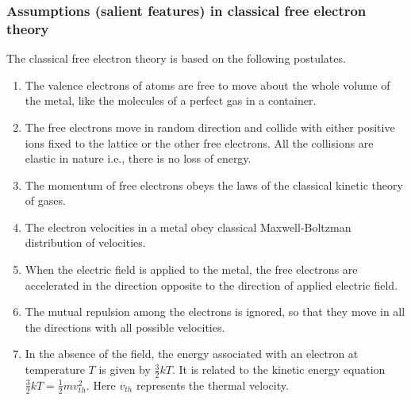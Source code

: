 \subsubsection{Assumptions (salient features) in classical free electron theory}
	The classical free electron theory is based on the following postulates.
\begin{enumerate}
	\item  The valence electrons of atoms are free to move about the whole volume of the metal, like the molecules of a perfect gas in a container.
	\item The free electrons move in random direction and collide with either positive ions fixed to the lattice or the other free electrons. All the collisions are elastic in nature i.e., there is no loss of energy.
	\item The momentum of free electrons obeys the laws of the classical kinetic theory of gases.
	\item The electron velocities in a metal obey classical Maxwell-Boltzman distribution of velocities.
	\item When the electric field is applied to the metal, the free electrons are accelerated in the direction opposite to the direction of applied electric field.
	\item  The mutual repulsion among the electrons is ignored, so that they move in all the directions with all possible velocities.
	\item  In the absence of the field, the energy associated with an electron at temperature $T$ is given by $\frac{3}{2} k T$. It is related to the kinetic energy equation $\frac{3}{2} k T=\frac{1}{2} m v_{t h}^{2}$. Here $v_{t h}$ represents the thermal velocity.
\end{enumerate}
